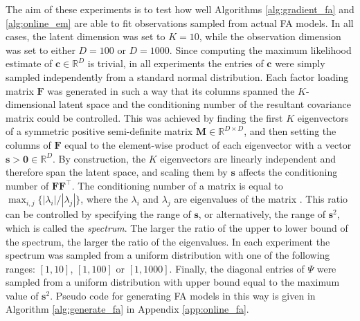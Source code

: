 \documentclass[msc,deptreport.inf]{infthesis} %
\newcommand{\matr}[1]{\mathbf{#1}}
\newcommand{\R}{\mathbb R}
\begin{document}
The aim of these experiments is to test how well Algorithms \ref{alg:gradient_fa} and \ref{alg:online_em} are able to fit observations sampled from actual FA models. In all cases, the latent dimension was set to $K=10$, while the observation dimension was set to either $D=100$ or $D=1000$. Since computing the maximum likelihood estimate of $\matr{c} \in \R^D$ is trivial, in all experiments the entries of $\matr{c}$ were simply sampled independently from a standard normal distribution. Each factor loading matrix $\matr{F}$ was generated in such a way that its columns spanned the $K$-dimensional latent space and the conditioning number of the resultant covariance matrix could be controlled. This was achieved by finding the first $K$ eigenvectors of a symmetric positive semi-definite matrix $\matr{M} \in \R^{D \times D}$, and then setting the columns of $\matr{F}$ equal to the element-wise product of each eigenvector with a vector $\matr{s} > \matr{0} \in \R^D$. By construction, the $K$ eigenvectors are linearly independent and therefore span the latent space, and scaling them by $\matr{s}$ affects the conditioning number of $\matr{F}\matr{F}^\intercal$. The conditioning number of a matrix is equal to $\max_{i, j} \{| \lambda_i | / | \lambda_j |\}$, where the $\lambda_i$ and $\lambda_j$ are eigenvalues of the matrix \cite{goodfellow2016}. This ratio can be controlled by specifying the  range of $\matr{s}$, or alternatively, the range of $\matr{s}^2$, which is called the \emph{spectrum}. The larger the ratio of the upper to lower bound of the spectrum, the larger the ratio of the eigenvalues. In each experiment the spectrum was sampled from a uniform distribution with one of the following ranges: $[1, 10]$, $[1, 100]$ or $[1, 1000]$. Finally, the diagonal entries of $\Psi$ were sampled from a uniform distribution with upper bound equal to the maximum value of $\matr{s}^2$. Pseudo code for generating FA models in this way is given in Algorithm \ref{alg:generate_fa} in Appendix \ref{app:online_fa}.
\end{document}
